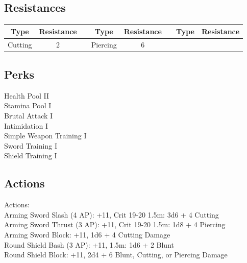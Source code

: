 \subsection{Resistances}
\begin{minipage}[H]{1\textwidth}
    \centering
    \begin{tabular}[c]{|c | c | c | c | c | c | c | c|}
        \hline
        Type & Resistance && Type & Resistance && Type & Resistance\\
        \hline
        Cutting & 2 &&
        Piercing & 6\\
        \hline
    \end{tabular}
\end{minipage}

\subsection{Perks}
Health Pool II\\
Stamina Pool I\\
Brutal Attack I\\
Intimidation I\\
Simple Weapon Training I\\
Sword Training I\\
Shield Training I\\

\subsection{Actions}
Actions:\\
Arming Sword Slash (4 AP): +11, Crit 19-20 1.5m: 3d6 + 4 Cutting\\

Arming Sword Thrust (3 AP): +11, Crit 19-20 1.5m: 1d8 + 4 Piercing\\

Arming Sword Block: +11, 1d6 + 4 Cutting Damage\\

Round Shield Bash (3 AP): +11, 1.5m: 1d6 + 2 Blunt\\

Round Shield Block: +11, 2d4 + 6 Blunt, Cutting, or Piercing Damage\\



